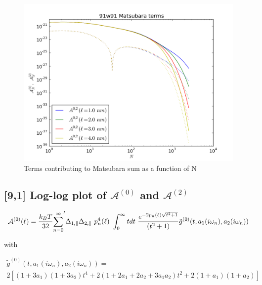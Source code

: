 \documentclass[a4paper]{article}
\begin{document}
\begin{center}
\begin{figure}[t!]
\begin{center}
\includegraphics[width=1.2\textwidth]{large_N/91_A_vs_lrg_n.png}
\hskip 43pt
\caption{Terms contributing to Matsubara sum as a function of N}
\label{eiz65}
\end{center}
\end{figure} 

\subsection{[9,1] Log-log plot of $\mathcal{A}^{(0)}$ and $\mathcal{A}^{(2)}$ }
\begin{equation}
{\cal A}^{(0)}(\ell) = \frac{k_BT}{32}  {\sum_{n=0}^{\infty}}' \Delta_{1,\parallel} \Delta_{2,\parallel} ~p_n^{4}(\ell) ~\int_0^{\infty} t dt ~\frac{e^{- 2 p_n(\ell) \sqrt{t^{2} + 1}}}{(t^{2} + 1)} \tilde g^{(0)}(t, a_1(i \omega_n), a_2(i \omega_n))
\end{equation}

with

\begin{multline*}
\tilde g^{(0)}(t, a_1(i \omega_n), a_2(i \omega_n)) = \\ 
2 \left[ (1+3a_1)(1+3a_2) t^{4} + 2 (1+2a_1+2a_2+3a_1a_2) t^{2}  + 2(1+a_1)(1+a_2)\right]
\end{multline*}


\end{center}
\end{document}
